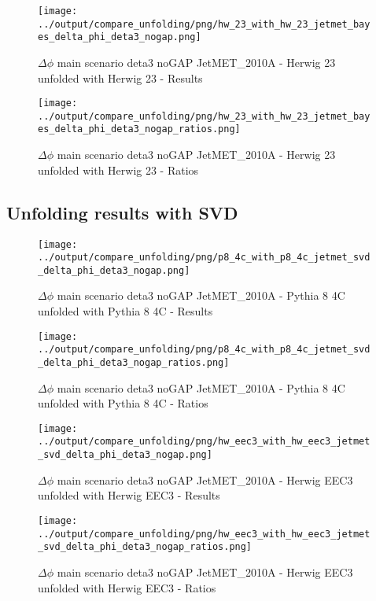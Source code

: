 \documentclass[11pt]{book}
\begin{document}
\begin{figure}[ht]
\centering
\texttt{[image: ../output/compare\_unfolding/png/hw\_23\_with\_hw\_23\_jetmet\_bayes\_delta\_phi\_deta3\_nogap.png]}
\caption{$\Delta\phi$ main scenario deta3 noGAP JetMET\_2010A - Herwig 23 unfolded with Herwig 23 - Results}
\label{hw_23_hw_23_jetmet_bayes_delta_phi_deta3_nogap_a}
\end{figure}

\begin{figure}[ht]
\centering
\texttt{[image: ../output/compare\_unfolding/png/hw\_23\_with\_hw\_23\_jetmet\_bayes\_delta\_phi\_deta3\_nogap\_ratios.png]}
\caption{$\Delta\phi$ main scenario deta3 noGAP JetMET\_2010A - Herwig 23 unfolded with Herwig 23 - Ratios}
\label{hw_23_hw_23_jetmet_bayes_delta_phi_deta3_nogap_b}
\end{figure}


\clearpage
\subsection{Unfolding results with SVD}

\begin{figure}[ht]
\centering
\texttt{[image: ../output/compare\_unfolding/png/p8\_4c\_with\_p8\_4c\_jetmet\_svd\_delta\_phi\_deta3\_nogap.png]}
\caption{$\Delta\phi$ main scenario deta3 noGAP JetMET\_2010A - Pythia 8 4C unfolded with Pythia 8 4C - Results}
\label{p8_p8_jetmet_svd_delta_phi_deta3_nogap_a}
\end{figure}

\begin{figure}[ht]
\centering
\texttt{[image: ../output/compare\_unfolding/png/p8\_4c\_with\_p8\_4c\_jetmet\_svd\_delta\_phi\_deta3\_nogap\_ratios.png]}
\caption{$\Delta\phi$ main scenario deta3 noGAP JetMET\_2010A - Pythia 8 4C unfolded with Pythia 8 4C - Ratios}
\label{p8_p8_jetmet_svd_delta_phi_deta3_nogap_b}
\end{figure}

\begin{figure}[ht]
\centering
\texttt{[image: ../output/compare\_unfolding/png/hw\_eec3\_with\_hw\_eec3\_jetmet\_svd\_delta\_phi\_deta3\_nogap.png]}
\caption{$\Delta\phi$ main scenario deta3 noGAP JetMET\_2010A - Herwig EEC3 unfolded with Herwig EEC3 - Results}
\label{hw_eec3_hw_eec3_jetmet_svd_delta_phi_deta3_nogap_a}
\end{figure}

\begin{figure}[ht]
\centering
\texttt{[image: ../output/compare\_unfolding/png/hw\_eec3\_with\_hw\_eec3\_jetmet\_svd\_delta\_phi\_deta3\_nogap\_ratios.png]}
\caption{$\Delta\phi$ main scenario deta3 noGAP JetMET\_2010A - Herwig EEC3 unfolded with Herwig EEC3 - Ratios}
\label{hw_eec3_hw_eec3_jetmet_svd_delta_phi_deta3_nogap_b}
\end{figure}
\end{document}
